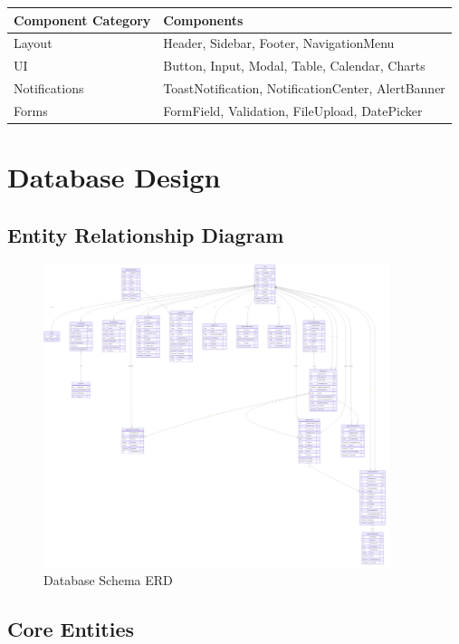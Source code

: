 \documentclass[12pt,a4paper]{article}
\begin{document}
\begin{longtable}{|p{3cm}|p{9cm}|}
\hline
\textbf{Component Category} & \textbf{Components} \\
\hline
Layout & Header, Sidebar, Footer, NavigationMenu \\
\hline
UI & Button, Input, Modal, Table, Calendar, Charts \\
\hline
Notifications & ToastNotification, NotificationCenter, AlertBanner \\
\hline
Forms & FormField, Validation, FileUpload, DatePicker \\
\hline
\end{longtable}

\section{Database Design}

\subsection{Entity Relationship Diagram}

\begin{figure}[H]
\centering
\includegraphics[width=0.9\textwidth]{diagrams/database_schema_erd}
\caption{Database Schema ERD}
\label{fig:database-erd}
\end{figure}

\subsection{Core Entities}
\end{document}
